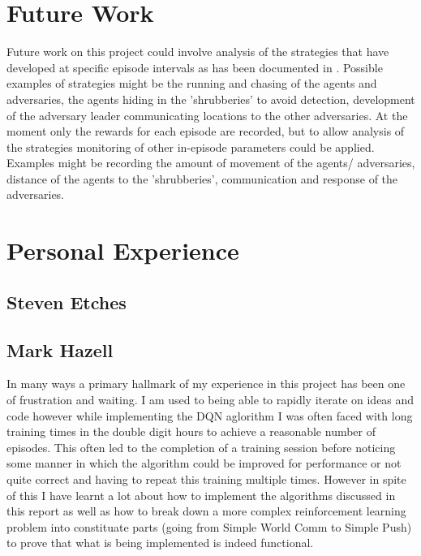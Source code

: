 \documentclass{article}
\begin{document}
\section{Future Work} \label{Future Work}

Future work on this project could involve analysis of the strategies that have developed at specific episode intervals as has been documented in \citet{emergenttoolusage}.
Possible examples of strategies might be the running and chasing of the agents and adversaries, the agents hiding in the 'shrubberies' to avoid detection, development of the adversary leader communicating locations to the other adversaries.
At the moment only the rewards for each episode are recorded, but to allow analysis of the strategies monitoring of other in-episode parameters could be applied.
Examples might be recording the amount of movement of the agents/ adversaries, distance of the agents to the 'shrubberies', communication and response of the adversaries.


\section{Personal Experience} \label{Personal Experience}

\subsection{Steven Etches}

\subsection{Mark Hazell}

In many ways a primary hallmark of my experience in this project has been one of frustration and waiting.
I am used to being able to rapidly iterate on ideas and code however while implementing the DQN aglorithm I was often faced with long training times in the double digit hours to achieve a reasonable number of episodes.
This often led to the completion of a training session before noticing some manner in which the algorithm could be improved for performance or not quite correct and having to repeat this training multiple times.
However in spite of this I have learnt a lot about how to implement the algorithms discussed in this report as well as how to break down a more complex reinforcement learning problem into constituate parts (going from Simple World Comm to Simple Push) to prove that what is being implemented is indeed functional.
\end{document}
